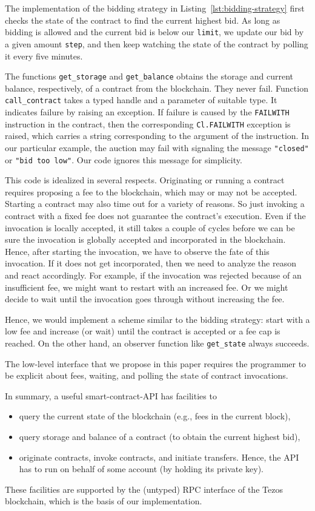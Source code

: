 \documentclass[runningheads]{llncs}
\begin{document}
The implementation of the bidding strategy in Listing~\ref{lst:bidding-strategy} first checks the state of the
contract to find the current highest bid. As long as bidding is
allowed and the current bid is below our \lstinline/limit/, we update
our bid by a given amount \lstinline/step/, and then keep watching the state of the contract by
polling it every five minutes. 

The functions \lstinline/get_storage/ and \lstinline/get_balance/
obtains the storage and current balance, respectively, of a contract from
the blockchain. They never fail. Function \lstinline/call_contract/
takes a typed handle and a parameter of suitable type. It indicates
failure by raising an exception. If failure is caused by the
\lstinline/FAILWITH/ instruction in the contract, then the
corresponding \lstinline/Cl.FAILWITH/ exception is raised, which
carries a string corresponding to the argument of the instruction. In
our particular example, the auction may fail with signaling the message
\lstinline/"closed"/ or \lstinline/"bid too low"/. Our
code ignores this message for simplicity.

This code is idealized in several respects. Originating or running a contract requires proposing a fee to the blockchain, which may or may not be
accepted.
Starting a contract may also time out for a variety of reasons. So just
invoking a contract with a fixed fee does not guarantee the contract's
execution.  Even if the invocation is locally accepted, it still takes
a couple of cycles before we can be sure the invocation is globally
accepted and incorporated in the blockchain.
Hence, after starting the invocation, we have to observe the fate of
this invocation. If it does not get incorporated, then we need to
analyze the reason and react accordingly. For example, if the
invocation was rejected because of an insufficient fee, we might want
to restart with an increased fee. Or we might decide to wait until the
invocation goes through without increasing the fee.

Hence, we would implement a scheme similar to
the bidding strategy: start with a low fee and increase (or wait) until the
contract is accepted or a fee cap is reached. On the other hand, an
observer function like \lstinline/get_state/ always succeeds.

The low-level interface that we propose in this paper requires the
programmer to be explicit about fees, waiting, and polling the state
of contract invocations. 

In summary, a useful smart-contract-API  has facilities to
\begin{itemize}
\item query the current state of the blockchain (e.g., fees in the
  current block),
\item query storage and balance of a contract (to obtain
  the current highest bid),
\item originate contracts, invoke contracts, and initiate
  transfers. Hence, the API has to run on
  behalf of some account (by holding its private key).
\end{itemize}
These facilities are supported by the (untyped) RPC interface of the Tezos
blockchain, which is the basis of our implementation. 
\end{document}
